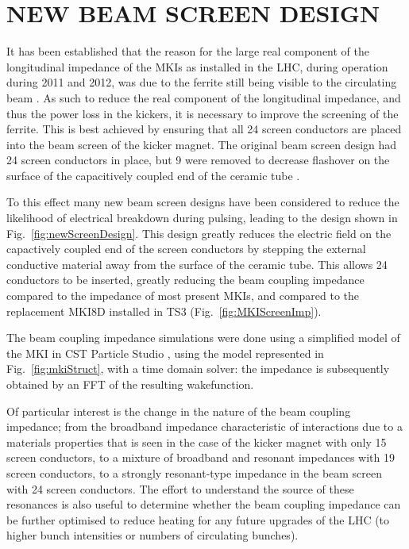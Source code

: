 \documentclass{JAC2003}
\begin{document}
\section{NEW BEAM SCREEN DESIGN}

It has been established that the reason for the large real component of the longitudinal impedance of the MKIs as installed in the LHC, during operation during 2011 and 2012, was due to the ferrite still being visible to the circulating beam \cite{kicker_meas}. As such to reduce the real component of the longitudinal impedance, and thus the power loss in the kickers, it is necessary to improve the screening of the ferrite. This is best achieved by ensuring that all 24 screen conductors are placed into the beam screen of the kicker magnet. The original beam screen design had 24 screen conductors in place, but 9 were removed to decrease flashover on the surface of the capacitively coupled end of the ceramic tube \cite{mki-ElecBreakdown}. 

To this effect many new beam screen designs have been considered to reduce the likelihood of electrical breakdown during pulsing, leading to the design shown in Fig.~\ref{fig:newScreenDesign}. This design greatly reduces the electric field on the capactively coupled end of the screen conductors by stepping the external conductive material away from the surface of the ceramic tube. This allows 24 conductors to be inserted, greatly reducing the beam coupling impedance compared to the impedance of most present MKIs, and compared to the replacement MKI8D installed in TS3 (Fig.~\ref{fig:MKIScreenImp}).

The beam coupling impedance simulations were done using a simplified model of the MKI in CST Particle Studio \cite{cst-cite}, using the model represented in Fig.~\ref{fig:mkiStruct}, with a time domain solver: the impedance is subsequently obtained by an FFT of the resulting wakefunction. 

Of particular interest is the change in the nature of the beam coupling impedance; from the broadband impedance characteristic of interactions due to a materials properties that is seen in the case of the kicker magnet with only 15 screen conductors, to a mixture of broadband and resonant impedances with 19 screen conductors, to a strongly resonant-type impedance in the beam screen with 24 screen conductors. The effort to understand the source of these resonances is also useful to determine whether the beam coupling impedance can be further optimised to reduce heating for any future upgrades of the LHC (to higher bunch intensities or numbers of circulating bunches).
\end{document}
